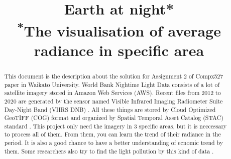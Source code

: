 \documentclass[conference]{IEEEtran}
\begin{document}
 
 
  
\title{Earth at night*\\
{\footnotesize \textsuperscript{*}The visualisation of average radiance in specific area}
}
 
\author{
\and
{}
\and
{}
\and
{}
\and
{}
}  

\maketitle

\begin{abstract}

This document is the description about the solution for Assignment 2 of Compx527 paper 
in Waikato University. World Bank Nightime Light Data consists of a lot of satellite imagery 
stored in Amazon Web Services (AWS). Recent files from 2012 to 2020 are generated by the sensor 
named Visible Infrared Imaging Radiometer Suite Day-Night Band (VIIRS DNB) \cite{WorldBan13:online}. All these things are 
stored by Cloud Optimized GeoTIFF (COG) \cite{CloudOpt5:online} format and organized by Spatial Temporal Asset Catalog (STAC) standard \cite{SpatioTe90:online}. 
This project only need the imagery in 3 specific areas, but it is neccessary to process all of them. 
From them, you can learn the trend of their radiance in the period. It is also a good chance to have a better understanding of ecnomic trend by them.
Some researchers also try to find the light pollution by this kind of data \cite{BARA2020106658}. 

\end{abstract}
\end{document}

